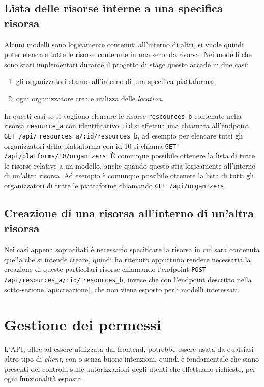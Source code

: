 \subsection{Lista delle risorse interne a una specifica risorsa} \label{api:lista-risorsa}
Alcuni modelli sono logicamente contenuti all'interno di altri, si vuole quindi poter elencare tutte le risorse contenute in una seconda risorsa. Nei modelli che sono stati implementati durante il progetto di stage questo accade in due casi:
\begin{enumerate}
	\item gli organizzatori stanno all'interno di una specifica piattaforma;
	\item ogni organizzatore crea e utilizza delle \emph{location}.
\end{enumerate} In questi casi se si vogliono elencare le risorse \verb|rescources_b| contenute nella risorsa \verb|resource_a| con identificativo \verb|:id| si effettua una chiamata all'endpoint \verb|GET /api/| \verb|resources_a/:id/resources_b|, ad esempio per elencare tutti gli organizzatori della piattaforma con id 10 si chiama \verb|GET /api/platforms/10/organizers|. È comunque possibile ottenere la lista di tutte le risorse relative a un modello, anche quando questo stia logicamente all'interno di un'altra risorsa. Ad esempio è comunque possibile ottenere la lista di tutti gli organizzatori di tutte le piattaforme chiamando \verb|GET /api/organizers|.

\subsection{Creazione di una risorsa all'interno di un'altra risorsa} \label{api:creazione-risorsa}
Nei casi appena sopracitati è necessario specificare la risorsa in cui sarà contenuta quella che si intende creare, quindi ho ritenuto oppurtuno rendere necessaria la creazione di queste particolari risorse chiamando l'endpoint \verb|POST /api/resources_a/:id/| \verb|resources_b|, invece che con l'endpoint descritto nella sotto-sezione \ref{api:creazione}, che non viene esposto per i modelli interessati.


\section{Gestione dei permessi}
L'API, oltre ad essere utilizzata dal frontend, potrebbe essere usata da qualsiasi altro tipo di \emph{client}, con o senza buone intenzioni, quindi è fondamentale che siano presenti dei controlli sulle autorizzazioni degli utenti che effettuano richieste, per ogni funzionalità esposta.

